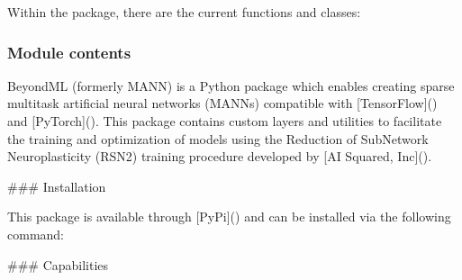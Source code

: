 \documentclass[letterpaper,10pt,english]{sphinxmanual}
\begin{document}
\sphinxAtStartPar
{}

\sphinxAtStartPar
Within the  package, there are the current functions and classes:
\sphinxhyphen{} 
\sphinxhyphen{} 
\sphinxhyphen{} 
\sphinxhyphen{} 
\sphinxhyphen{} 
\sphinxhyphen{} 
\sphinxhyphen{} 
\sphinxhyphen{} 
\sphinxhyphen{} 
\sphinxhyphen{} 
\sphinxhyphen{} 


\subsubsection{Module contents}
\label{\detokenize{beyondml:module-beyondml}}\label{\detokenize{beyondml:module-contents}}
\sphinxAtStartPar
BeyondML (formerly MANN) is a Python package which enables creating sparse multitask artificial neural networks (MANNs)
compatible with {[}TensorFlow{]}() and {[}PyTorch{]}(). This package
contains custom layers and utilities to facilitate the training and optimization of models using the
Reduction of Sub\sphinxhyphen{}Network Neuroplasticity (RSN2) training procedure developed by {[}AI Squared, Inc{]}().

\sphinxAtStartPar
\#\#\# Installation

\sphinxAtStartPar
This package is available through {[}PyPi{]}() and can be installed via the following command:

\sphinxAtStartPar
{}

\sphinxAtStartPar
\#\#\# Capabilities
\end{document}
